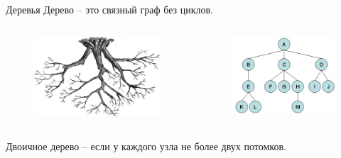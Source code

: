 \documentclass[10pt]{beamer}
\begin{document}
\begin{frame}{Деревья}
Дерево -- это связный граф без циклов.
\begin{columns}
	\begin{column}{.3\linewidth}
		\begin{figure}
		\centerline{\includegraphics[width=1.6\linewidth]{images/littree.png}}
		\end{figure}
	\end{column}
	\begin{column}{.3\linewidth}
		\begin{figure}
		\centerline{\includegraphics[width=1.6\linewidth]{images/tree.jpg}}
		\end{figure}
	\end{column}
\end{columns}
Двоичное дерево -- если у каждого узла не более двух потомков.
\end{frame}
\end{document}
